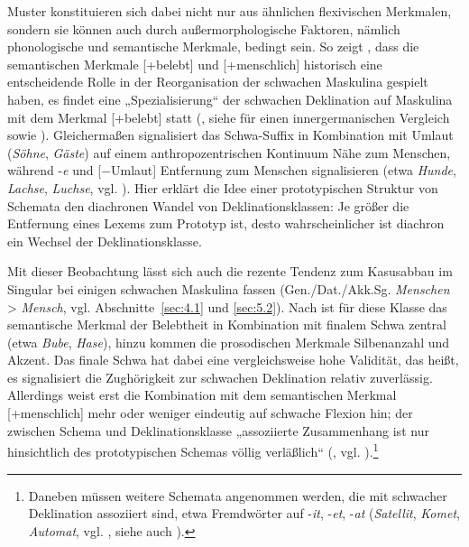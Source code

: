 Muster konstituieren sich dabei nicht nur aus ähnlichen flexivischen Merkmalen, sondern sie können auch durch außermorphologische Faktoren, nämlich phonologische und semantische Merkmale, bedingt sein. So zeigt \citet{Köpcke1993, Köpcke1994, Köpcke2000a}, dass die semantischen Merkmale [+belebt] und [+menschlich] historisch eine entscheidende Rolle in der Reorganisation der schwachen Maskulina gespielt haben, es findet eine „Spezialisierung“ der schwachen Deklination auf Maskulina mit dem Merkmal [+belebt] statt (\citealt[369]{Kürschner2008a}, siehe \citealt{Kürschner2021} für einen innergermanischen Vergleich sowie ). Gleichermaßen signalisiert das Schwa-Suffix in Kombination mit Umlaut (\textit{Söhne}, \textit{Gäs\-te}) auf einem anthropozentrischen Kontinuum Nähe zum Menschen, während -\textit{e} und \mbox{[−Umlaut]} Entfernung zum Menschen signalisieren (etwa \textit{Hunde}, \textit{Lachse}, \textit{Luchse}, vgl. \citealt[84]{Köpcke1994}). Hier erklärt die Idee einer prototypischen Struktur von Schemata den diachronen Wandel von Deklinationsklassen: Je größer die Entfernung eines Lexems zum Prototyp ist, desto wahrscheinlicher ist diachron ein Wechsel der Deklinationsklasse.

Mit dieser Beobachtung lässt sich auch die rezente Tendenz zum Kasusabbau im Singular bei einigen schwachen Maskulina fassen (Gen./Dat./Akk.Sg. \textit{Menschen} > \textit{Mensch}, vgl. Abschnitte~\ref{sec:4.1} und \ref{sec:5.2}). Nach \citet{Köpcke2000a, Köpcke2002} ist für diese Klasse das semantische Merkmal der Belebtheit in Kombination mit finalem Schwa zentral (etwa \textit{Bube}, \textit{Hase}), hinzu kommen die prosodischen Merkmale Silbenanzahl und Akzent. Das finale Schwa hat dabei eine vergleichsweise hohe Validität, das heißt, es signalisiert die Zughörigkeit zur schwachen Deklination relativ zuverlässig. Allerdings weist erst die Kombination mit dem semantischen Merkmal [+menschlich] mehr oder weniger eindeutig auf schwache Flexion hin; der zwischen Schema und Deklinationsklasse „assoziierte Zusammenhang ist nur hinsichtlich des prototypischen Schemas völlig verläßlich“ (\citealt[109]{Köpcke2000a}, vgl. \citealt[104]{Köpcke2002}).\footnote{Daneben müssen weitere Schemata angenommen werden, die mit schwacher Deklination assoziiert sind, etwa Fremdwörter auf -\textit{it}, -\textit{et}, -\textit{at} (\textit{Satellit}, \textit{Komet}, \textit{Automat}, vgl. \citealt[443]{Kürschner2021}, siehe auch \citealt{Thieroff2003}).}


